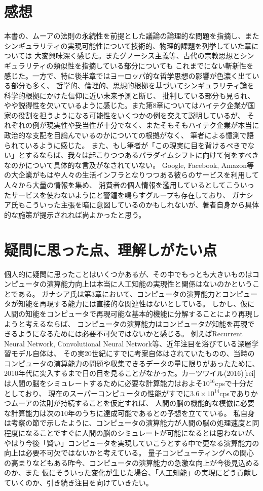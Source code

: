 \documentclass[uplatex]{jsarticle}
\begin{document}
\section{感想}
本書の、ムーアの法則の永続性を前提とした議論の論理的な問題を指摘し、またシンギュラリティの実現可能性について技術的、物理的課題を列挙していた章については
大変興味深く感じた。またグノーシス主義等、古代の宗教思想とシンギュラリティの類似性を指摘している部分についても
これまでにない斬新性を感じた。一方で、特に後半章ではヨーロッパ的な哲学思想の影響が色濃く出ている部分も多く、
哲学的、倫理的、思想的根拠を基づいてシンギュラリティ論を科学的根拠にかけた信仰に近い未来予測と断じ、
批判している部分も見られ、やや説得性を欠いているように感じた。また第8章についてはハイテク企業が国家の役割を担うようになる可能性をいくつかの例を交えて説明しているが、
それぞれの例が現実性や妥当性が十分でなく、またそもそもハイテク企業が本当に政治的な支配を目論んでいるのかについての根拠がなく、
筆者による憶測で語られているように感じた。
また、もし筆者が「この現実に目を背けるべきでない」とするならば、我々は起こりつつあるパラダイムシフトに向けて何をすべきなのかについて具体的な言及がなされていない。
Google, Facebook, Amazon等の大企業がもはや人々の生活インフラとなりつつある彼らのサービスを利用して人々から大量の情報を集め、
消費者の個人情報を濫用しているとしてこういったサービスを使わないようにと警鐘を鳴らすグループも存在しており、
ガナシア氏もこういった主張を暗に意図しているのかもしれないが、著者自身から具体的な施策が提示されれば尚よかったと思う。

\section{疑問に思った点、理解しがたい点}
個人的に疑問に思ったことはいくつかあるが、その中でもっとも大きいものはコンピュータの演算能力向上は本当に人工知能の実現性と関係はないのかということである。
ガナシア氏は第3章において、コンピュータの演算能力とコンピュータが知能を再現する能力には直接的な関連性はないとしている。
しかし、仮に人間の知能をコンピュータで再現可能な基本的機能に分解することにより再現しようと考えるならば、
コンピュータの演算能力はコンピュータが知能を再現できるようになるためには必要不可欠ではないかと感じる。
例えばRecurrent Neural Network, Convolutional Neural Network等、近年注目を浴びている深層学習モデル自体は、
その実20世紀にすでに考案自体はされていたものの、当時のコンピュータの演算能力の問題や収集できるデータの量に限りがあったために、
2010年代に突入するまで日の目を見ることがなかった。カーツワイル(2016)$\cite{rei}$は人間の脳をシミュレートするために必要な計算能力はおよそ$10^{16}$cpsで十分だとしており、
現在のスーパーコンピュータの性能がすでに$3.6 \times 10 ^ {14}$cpsでありかつムーアの法則が持続することを仮定すれば、
人間の脳の機能的な模倣に必要な計算能力は次の10年のうちに達成可能であるとの予想を立てている。
私自身は考察の節で示したように、コンピュータの演算能力が人間の脳の処理速度と同程度になることですぐに人間の脳のシミュレートが可能になるとは思わないが、
やはり今後「賢い」コンピュータを実現していこうとする中で更なる演算能力の向上は必要不可欠ではないかと考えている。
量子コンピューティングへの関心の高まりなどもある昨今、コンピュータの演算能力の急激な向上が今後見込めるのか、また
仮にそういった変化が生じた場合、「人工知能」の実現にどう貢献していくのか、引き続き注目を向けていきたい。
\end{document}
